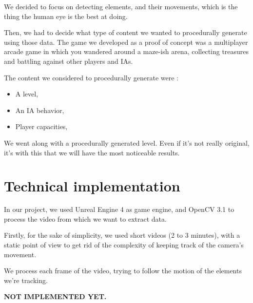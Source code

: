\documentclass[conference]{acmsiggraph}
\begin{document}
We decided to focus on detecting elements, and their movements, which is the thing the human eye is the best at doing.

Then, we had to decide what type of content we wanted to procedurally generate using those data.
The game we developed as a proof of concept was a multiplayer arcade game in which you wandered around a maze-ish arena, collecting treasures and battling against other players and IAs.

The content we considered to procedurally generate were :
\begin{itemize}
	\item A level,
	\item An IA behavior,
	\item Player capacities,
\end{itemize}

We went along with a procedurally generated level. Even if it's not really original, it's with this that we will have the most noticeable results.

\section{Technical implementation}

In our project, we used Unreal Engine 4 as game engine, and OpenCV 3.1 to process the video from which we want to extract data.

Firstly, for the sake of simplicity, we used short videos (2 to 3 minutes), with a static point of view to get rid of the complexity of keeping track of the camera's movement.

We process each frame of the video, trying to follow the motion of the elements we're tracking.

\textbf{NOT IMPLEMENTED YET.}


\nocite{*}

\end{document}
